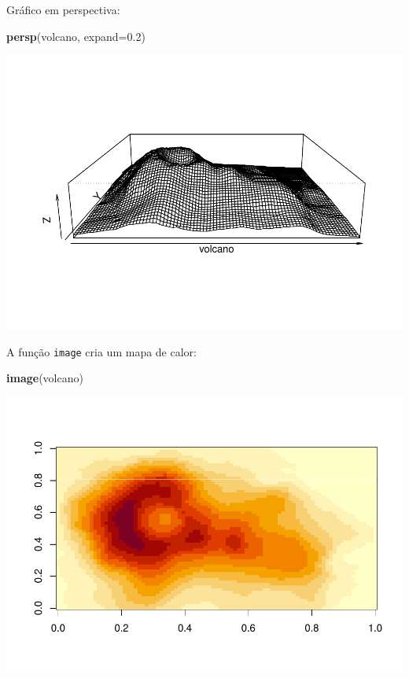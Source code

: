 \documentclass[
]{book}
\newenvironment{Shaded}{\begin{snugshade}}{\end{snugshade}}
\newcommand{\DataTypeTok}[1]{\textcolor[rgb]{0.13,0.29,0.53}{#1}}
\newcommand{\FloatTok}[1]{\textcolor[rgb]{0.00,0.00,0.81}{#1}}
\newcommand{\KeywordTok}[1]{\textcolor[rgb]{0.13,0.29,0.53}{\textbf{#1}}}
\newcommand{\NormalTok}[1]{#1}
\begin{document}
Gráfico em perspectiva:

\begin{Shaded}
\begin{Highlighting}[]
\KeywordTok{persp}\NormalTok{(volcano, }\DataTypeTok{expand=}\FloatTok{0.2}\NormalTok{)}
\end{Highlighting}
\end{Shaded}

\includegraphics{TudodoR_files/figure-latex/unnamed-chunk-75-1.pdf}

A função \texttt{image} cria um mapa de calor:

\begin{Shaded}
\begin{Highlighting}[]
\KeywordTok{image}\NormalTok{(volcano)}
\end{Highlighting}
\end{Shaded}

\includegraphics{TudodoR_files/figure-latex/unnamed-chunk-76-1.pdf}
\end{document}
